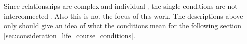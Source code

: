 Since relationships are complex and individual \cite{sassler2010partnering}, the single conditions are not interconnected . Also this is not the focus of this work. The descriptions above only should give an idea of what the conditions mean for the following section \ref{sec:consideration_life_course_conditions}.

